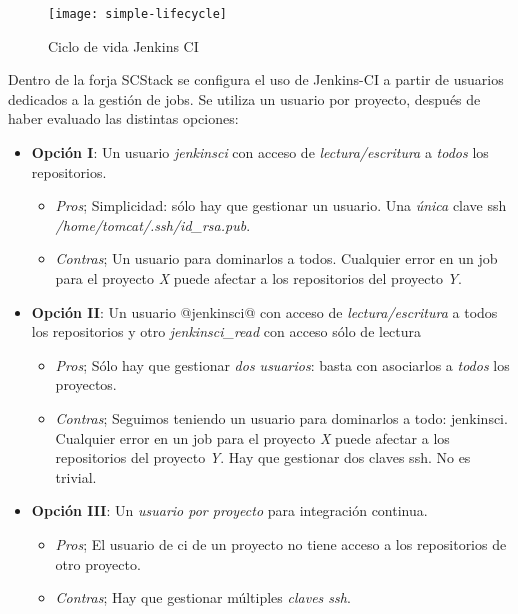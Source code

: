 \begin{figure}[H]
    \centering
    \texttt{[image: simple-lifecycle]}
    \caption{Ciclo de vida Jenkins CI}
    \label{fig:simple-lifecycle}
\end{figure}

\par Dentro de la forja SCStack se configura el uso de Jenkins-CI a partir de usuarios dedicados a la gestión de jobs. Se utiliza un usuario por proyecto, después de haber evaluado las distintas opciones:

\begin{itemize}
	\item \textbf{Opción I}: Un usuario \emph{jenkinsci} con acceso de \emph{lectura/escritura} a \emph{todos} los repositorios.
        \begin{itemize}

        	\item \emph{Pros}; Simplicidad: sólo hay que gestionar un usuario. Una \emph{única} clave ssh \emph{/home/tomcat/.ssh/id\_rsa.pub}.
        	\item \emph{Contras}; Un usuario para dominarlos a todos. Cualquier error en un job para el proyecto \emph{X} puede afectar a los repositorios del proyecto \emph{Y}.
        \end{itemize}

	\item \textbf{Opción II}: Un usuario @jenkinsci@ con acceso de \emph{lectura/escritura} a todos los repositorios y  otro \emph{jenkinsci\_read} con acceso sólo de lectura	
        \begin{itemize}
        	\item \emph{Pros}; Sólo hay que gestionar \emph{dos usuarios}: basta con asociarlos a \emph{todos} los proyectos.
        	\item \emph{Contras}; Seguimos teniendo un usuario para dominarlos a todo: jenkinsci. Cualquier error en un job para el proyecto \emph{X} puede afectar a los repositorios del proyecto \emph{Y}. Hay que gestionar dos claves ssh. No es trivial.
        \end{itemize}

	\item \textbf{Opción III}: Un \emph{usuario por proyecto} para integración continua.
        \begin{itemize}
        	\item \emph{Pros}; El usuario de ci de un proyecto no tiene acceso a los repositorios de otro proyecto.
        	\item \emph{Contras}; Hay que gestionar múltiples \emph{claves ssh}.
        \end{itemize}

\end{itemize}


